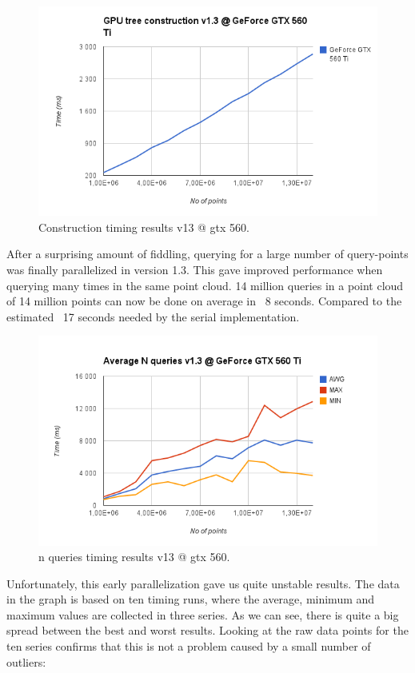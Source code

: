 \begin{figure}[ht!]
\centering
\includegraphics[width=120mm]{../gfx/construction_v13_gtx_560.png}

\caption{Construction timing results v13 @ gtx 560.}
\label{fig:construction_v13_gtx_560}
\end{figure}

After a surprising amount of fiddling, querying for a large number of query-points was finally parallelized in version 1.3. This gave improved performance when querying many times in the same point cloud. 14 million queries in a point cloud of 14 million points can now be done on average in ~8 seconds. Compared to the estimated ~17 seconds needed by the serial implementation.

\begin{figure}[ht!]
\centering
\includegraphics[width=120mm]{../gfx/n_queries_v13_gtx_560.png}

\caption{n queries timing results v13 @ gtx 560.}
\label{fig:n_queries_v13_gtx_560}
\end{figure}

Unfortunately, this early parallelization gave us quite unstable results. The data in the graph is based on ten timing runs, where the average, minimum and maximum values are collected in three series. As we can see, there is quite a big spread between the best and worst results. Looking at the raw data points for the ten series confirms that this is not a problem caused by a small number of outliers:

